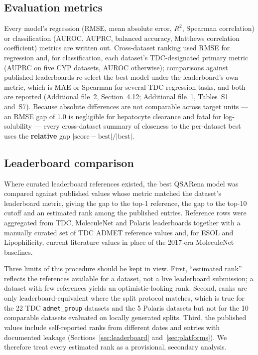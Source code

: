 \subsection{Evaluation metrics}\label{sec:metrics}

Every model's regression (RMSE, mean absolute error, $R^2$, Spearman correlation) or classification (AUROC, AUPRC, balanced accuracy, Matthews correlation coefficient) metrics are written out. Cross-dataset ranking used RMSE for regression and, for classification, each dataset's TDC-designated primary metric (AUPRC on five CYP datasets, AUROC otherwise); comparisons against published leaderboards re-select the best model under the leaderboard's own metric, which is MAE or Spearman for several TDC regression tasks, and both are reported (Additional file~2, Section~4.12; Additional file~1, Tables~S1 and~S7). Because absolute differences are not comparable across target units --- an RMSE gap of 1.0 is negligible for hepatocyte clearance and fatal for log-solubility --- every cross-dataset summary of closeness to the per-dataset best uses the \textbf{relative} gap $|\text{score}-\text{best}|/|\text{best}|$.

\subsection{Leaderboard comparison}\label{sec:lbmethod}

Where curated leaderboard references existed, the best QSARena model was compared against published values whose metric matched the dataset's leaderboard metric, giving the gap to the top-1 reference, the gap to the top-10 cutoff and an estimated rank among the published entries. Reference rows were aggregated from TDC, MoleculeNet and Polaris leaderboards together with a manually curated set of TDC ADMET reference values and, for ESOL and Lipophilicity, current literature values in place of the 2017-era MoleculeNet baselines.

Three limits of this procedure should be kept in view. First, ``estimated rank'' reflects the references available for a dataset, not a live leaderboard submission; a dataset with few references yields an optimistic-looking rank. Second, ranks are only leaderboard-equivalent where the split protocol matches, which is true for the 22 TDC \texttt{admet\_group} datasets and the 5 Polaris datasets but not for the 10 comparable datasets evaluated on locally generated splits. Third, the published values include self-reported ranks from different dates and entries with documented leakage (Sections~\ref{sec:leaderboard} and~\ref{sec:platforms}). We therefore treat every estimated rank as a provisional, secondary analysis.

